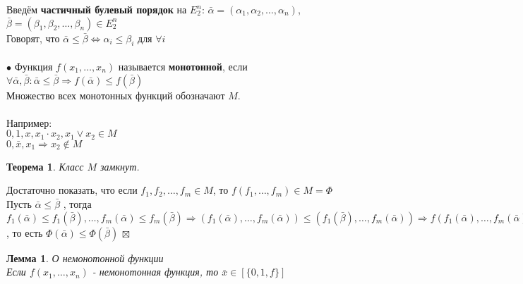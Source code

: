\documentclass[a4paper, 12pt]{report}
\newenvironment{Proof} %
{\par\noindent{$\blacklozenge$}} %
{\hfill$\scriptstyle\boxtimes$} %
\newtheorem*{theorem}{Теорема} %
\newtheorem*{lemma}{Лемма} %
\begin{document}
Введём \textbf{частичный булевый порядок} на $E^n_2$: $\bar \alpha = (\alpha_1, \alpha_2, \dots, \alpha_n)$, $\bar \beta = (\beta_1, \beta_2, \dots, \beta_n) \in E^n_2$\\
Говорят, что $\bar \alpha \leqslant \bar \beta \Leftrightarrow  \alpha_{i} \leqslant \beta_{i}$ для $\forall i$\\\\
$\bullet$ Функция $f(x_1, \dots, x_n)$ называется \textbf{монотонной}, если $\forall \bar \alpha, \bar \beta: \bar \alpha \leqslant \bar \beta \Rightarrow f(\bar \alpha) \leqslant f(\bar \beta)$\\
Множество всех монотонных функций обозначают $M$.\\\\
Например:\\
$0, 1, x, x_1 \cdot x_2, x_1 \vee x_2 \in M$\\
$0, \bar x, x_1 \Rightarrow x_2 \notin M$
\begin{theorem}
Класс $M$ замкнут.
\end{theorem}
\begin{Proof}
Достаточно показать, что если $f_1, f_2, \dots, f_m \in M$, то $f(f_1, \dots, f_m) \in M = \Phi$\\
Пусть $\bar \alpha \leqslant \bar \beta$ , тогда $f_1(\bar \alpha) \leqslant f_1(\bar \beta), \dots, f_m(\bar \alpha) \leqslant f_m(\bar \beta) \Rightarrow (f_1(\bar \alpha), \dots , f_m(\bar \alpha)) \leqslant (f_1(\bar \beta), \dots, f_m(\bar \alpha)) \Rightarrow f(f_1(\bar \alpha), \dots , f_m(\bar \alpha)) \leqslant f(f_1(\bar \beta), \dots, f_m(\bar \alpha))$, то есть $\Phi(\bar \alpha) \leqslant \Phi (\bar \beta)$
\end{Proof}\\
\begin{lemma}
О немонотонной функции\\
Если $f(x_1, \dots, x_n)$ - немонотонная функция, то $\bar x \in [\{0, 1, f\}]$ 
\end{lemma}
\end{document}
